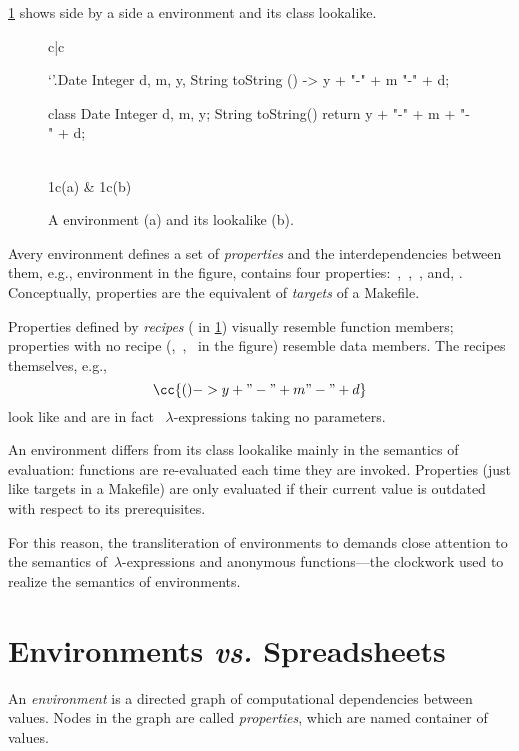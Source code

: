 \cref{figure:date} shows side by a side a \Reap environment and its \Java
class lookalike.

\begin{figure}
  \caption{\label{figure:date}%
    A \Reap environment (a) and its \Java lookalike (b).
  }
  \begin{tabular}{c|c}
    \begin{reap}
    `'.Date {
    Integer d, m, y,
    String toString () ->
    y + "-" + m "-" + d;
    }
    \end{reap}

    \begin{java}
    class Date {
    Integer d, m, y;
    String toString() {
    return
    y + "-" + m + "-" + d;
      }
    }
    \end{java}
      \\ \multicolumn1c{(a)} & \multicolumn1c{(b)}
  \end{tabular}
\end{figure}

Avery environment defines a set of \emph{properties} and the interdependencies
between them, e.g., environment  in the figure, contains four
properties:~,~,~, and, . Conceptually,
properties are the equivalent of \emph{targets} of a Makefile.

Properties defined by \emph{recipes} ( in \cref{figure:date})
visually resemble function members; properties with no recipe
(,~,~ in the figure) resemble data members.
The recipes themselves, e.g., \[
\cc{ () -> y + "-" + m "-" + d}
\] look like and are in fact \Java~$λ$-expressions taking no parameters.

An environment differs from its class lookalike mainly in the semantics of
evaluation: functions are re-evaluated each time they are invoked. Properties
(just like targets in a Makefile) are only evaluated if their current value
is outdated with respect to its prerequisites.

For this reason, the transliteration of environments to \Java demands close
attention to the semantics of~$λ$-expressions and anonymous functions---the
\Java clockwork used to realize the semantics of environments.

\section{Environments \emph{vs.} Spreadsheets}

An \emph{environment} is a directed graph of computational dependencies between
values. Nodes in the graph are called \emph{properties}, which are named
container of values.


